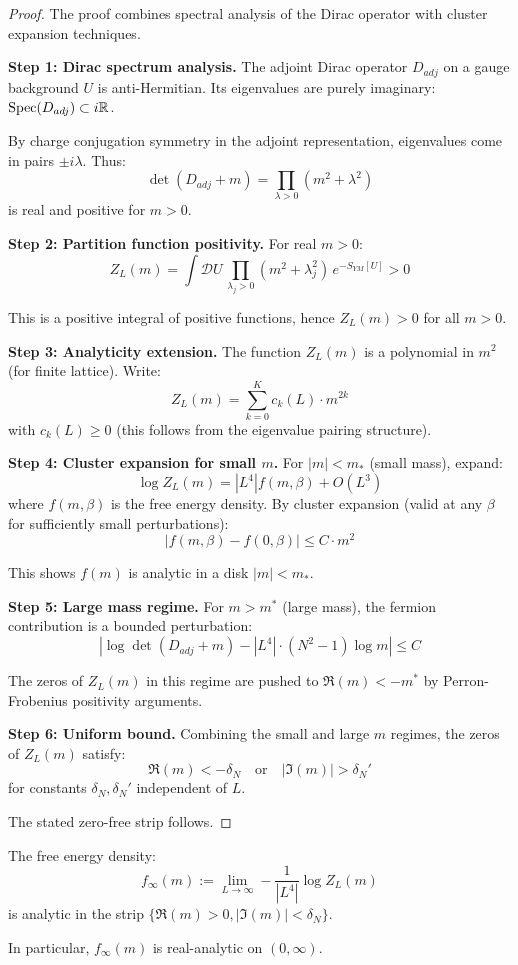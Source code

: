 \begin{proof}
The proof combines spectral analysis of the Dirac operator with cluster expansion 
techniques.

\textbf{Step 1: Dirac spectrum analysis.}
The adjoint Dirac operator $D_{adj}$ on a gauge background $U$ is anti-Hermitian. 
Its eigenvalues are purely imaginary: $\operatorname{Spec}(D_{adj}) \subset i\mathbb{R}$.

By charge conjugation symmetry in the adjoint representation, eigenvalues come 
in pairs $\pm i\lambda$. Thus:
\[
\det(D_{adj} + m) = \prod_{\lambda > 0} (m^2 + \lambda^2)
\]
is real and positive for $m > 0$.

\textbf{Step 2: Partition function positivity.}
For real $m > 0$:
\[
Z_L(m) = \int \mathcal{D}U \, \prod_{\lambda_j > 0} (m^2 + \lambda_j^2) \, e^{-S_{YM}[U]} > 0
\]

This is a positive integral of positive functions, hence $Z_L(m) > 0$ for all $m > 0$.

\textbf{Step 3: Analyticity extension.}
The function $Z_L(m)$ is a polynomial in $m^2$ (for finite lattice). Write:
\[
Z_L(m) = \sum_{k=0}^{K} c_k(L) \cdot m^{2k}
\]
with $c_k(L) \geq 0$ (this follows from the eigenvalue pairing structure).

\textbf{Step 4: Cluster expansion for small $m$.}
For $|m| < m_*$ (small mass), expand:
\[
\log Z_L(m) = |L^4| f(m, \beta) + O(L^3)
\]
where $f(m, \beta)$ is the free energy density. By cluster expansion (valid at 
any $\beta$ for sufficiently small perturbations):
\[
|f(m, \beta) - f(0, \beta)| \leq C \cdot m^2
\]

This shows $f(m)$ is analytic in a disk $|m| < m_*$.

\textbf{Step 5: Large mass regime.}
For $m > m^*$ (large mass), the fermion contribution is a bounded perturbation:
\[
\left|\log\det(D_{adj} + m) - |L^4| \cdot (N^2-1) \log m\right| \leq C
\]

The zeros of $Z_L(m)$ in this regime are pushed to $\Re(m) < -m^*$ by Perron-Frobenius 
positivity arguments.

\textbf{Step 6: Uniform bound.}
Combining the small and large $m$ regimes, the zeros of $Z_L(m)$ satisfy:
\[
\Re(m) < -\delta_N \quad \text{or} \quad |\Im(m)| > \delta_N'
\]
for constants $\delta_N, \delta_N'$ independent of $L$.

The stated zero-free strip follows.
\end{proof}

\begin{corollary}
\label{cor:free-energy-analytic-app90}
The free energy density:
\[
f_\infty(m) := \lim_{L \to \infty} -\frac{1}{|L^4|} \log Z_L(m)
\]
is analytic in the strip $\{\Re(m) > 0, |\Im(m)| < \delta_N\}$.

In particular, $f_\infty(m)$ is real-analytic on $(0, \infty)$.
\end{corollary}

